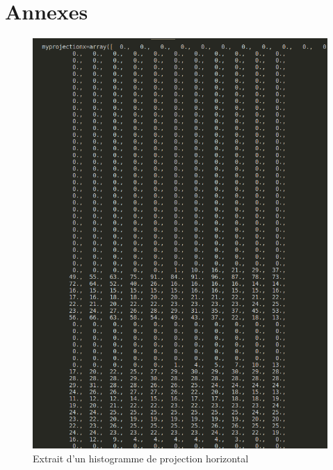 \documentclass[a4paper]{article}
\begin{document}
	\section*{Annexes}
		\begin{figure}
				\includegraphics[width=\textwidth]{histoX.png}
				\centering
				\caption{Extrait d'un histogramme de projection horizontal}
				\label{fig:histoX}
			\end{figure}
\end{document}
